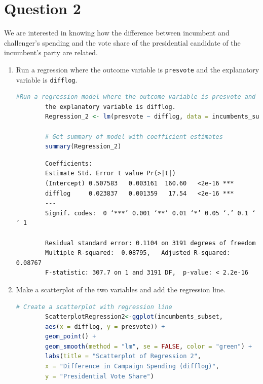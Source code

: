 \documentclass[12pt,letterpaper]{article}
\begin{document}
	
	
\newpage

\section*{Question 2}
\noindent We are interested in knowing how the difference between incumbent and challenger's spending and the vote share of the presidential candidate of the incumbent's party are related.	\vspace{.25cm}
	\begin{enumerate}
		\item Run a regression where the outcome variable is \texttt{presvote} and the explanatory variable is \texttt{difflog}.	\vspace{1cm}
		
		\begin{lstlisting}[language=R, caption={Regression Model 2 in R}, label={lst:regression_model}]
		#Run a regression model where the outcome variable is presvote and 
		the explanatory variable is difflog.
		Regression_2 <- lm(presvote ~ difflog, data = incumbents_subset)
	
		# Get summary of model with coefficient estimates
		summary(Regression_2)
		\end{lstlisting}		
		
		
		\begin{verbatim}
		Coefficients:
		Estimate Std. Error t value Pr(>|t|)    
		(Intercept) 0.507583   0.003161  160.60   <2e-16 ***
		difflog     0.023837   0.001359   17.54   <2e-16 ***
		---
		Signif. codes:  0 ‘***’ 0.001 ‘**’ 0.01 ‘*’ 0.05 ‘.’ 0.1 ‘ ’ 1
		
		Residual standard error: 0.1104 on 3191 degrees of freedom
		Multiple R-squared:  0.08795,	Adjusted R-squared:  0.08767 
		F-statistic: 307.7 on 1 and 3191 DF,  p-value: < 2.2e-16
	\end{verbatim}
		
		
		\newpage
		\item Make a scatterplot of the two variables and add the regression line. 	\vspace{1cm}
		
		\begin{lstlisting}[language=R, caption={Scatterplot 1 code in R}, label={lst:regression_model}]
		# Create a scatterplot with regression line
		ScatterplotRegression2<-ggplot(incumbents_subset, 
		aes(x = difflog, y = presvote)) +
		geom_point() +
		geom_smooth(method = "lm", se = FALSE, color = "green") +
		labs(title = "Scatterplot of Regression 2",
		x = "Difference in Campaign Spending (difflog)",
		y = "Presidential Vote Share")
		

\end{lstlisting}
\end{enumerate}
\end{document}
